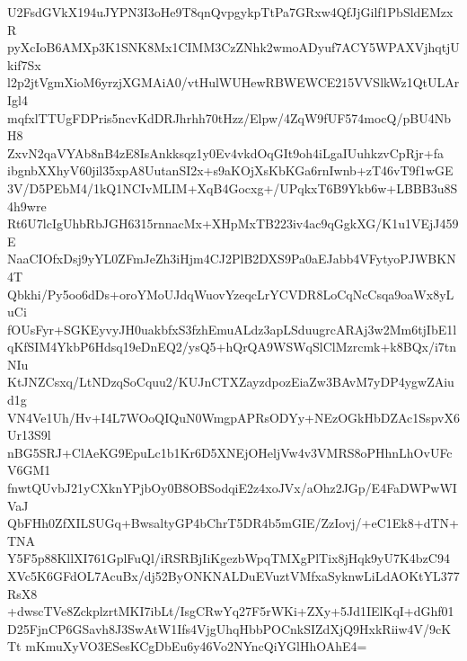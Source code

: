U2FsdGVkX194uJYPN3I3oHe9T8qnQvpgykpTtPa7GRxw4QfJjGilf1PbSldEMzxR
pyXcIoB6AMXp3K1SNK8Mx1CIMM3CzZNhk2wmoADyuf7ACY5WPAXVjhqtjUkif7Sx
l2p2jtVgmXioM6yrzjXGMAiA0/vtHulWUHewRBWEWCE215VVSlkWz1QtULArIgl4
mqfxlTTUgFDPris5ncvKdDRJhrhh70tHzz/Elpw/4ZqW9fUF574mocQ/pBU4NbH8
ZxvN2qaVYAb8nB4zE8IsAnkksqz1y0Ev4vkdOqGIt9oh4iLgaIUuhkzvCpRjr+fa
ibgnbXXhyV60jil35xpA8UutanSI2x+s9aKOjXsKbKGa6rnIwnb+zT46vT9f1wGE
3V/D5PEbM4/1kQ1NCIvMLIM+XqB4Gocxg+/UPqkxT6B9Ykb6w+LBBB3u8S4h9wre
Rt6U7lcIgUhbRbJGH6315rnnacMx+XHpMxTB223iv4ac9qGgkXG/K1u1VEjJ459E
NaaCIOfxDsj9yYL0ZFmJeZh3iHjm4CJ2PlB2DXS9Pa0aEJabb4VFytyoPJWBKN4T
Qbkhi/Py5oo6dDs+oroYMoUJdqWuovYzeqcLrYCVDR8LoCqNcCsqa9oaWx8yLuCi
fOUsFyr+SGKEyvyJH0uakbfxS3fzhEmuALdz3apLSduugrcARAj3w2Mm6tjIbE1l
qKfSIM4YkbP6Hdsq19eDnEQ2/ysQ5+hQrQA9WSWqSlClMzrcmk+k8BQx/i7tnNIu
KtJNZCsxq/LtNDzqSoCquu2/KUJnCTXZayzdpozEiaZw3BAvM7yDP4ygwZAiud1g
VN4Ve1Uh/Hv+I4L7WOoQIQuN0WmgpAPRsODYy+NEzOGkHbDZAc1SspvX6Ur13S9l
nBG5SRJ+ClAeKG9EpuLc1b1Kr6D5XNEjOHeljVw4v3VMRS8oPHhnLhOvUFcV6GM1
fnwtQUvbJ21yCXknYPjbOy0B8OBSodqiE2z4xoJVx/aOhz2JGp/E4FaDWPwWIVaJ
QbFHh0ZfXILSUGq+BwsaltyGP4bChrT5DR4b5mGIE/ZzIovj/+eC1Ek8+dTN+TNA
Y5F5p88KllXI761GplFuQl/iRSRBjIiKgezbWpqTMXgPlTix8jHqk9yU7K4bzC94
XVc5K6GFdOL7AcuBx/dj52ByONKNALDuEVuztVMfxaSyknwLiLdAOKtYL377RsX8
+dwscTVe8ZckplzrtMKI7ibLt/IsgCRwYq27F5rWKi+ZXy+5Jd1IElKqI+dGhf01
D25FjnCP6GSavh8J3SwAtW1Ifs4VjgUhqHbbPOCnkSIZdXjQ9HxkRiiw4V/9cKTt
mKmuXyVO3ESesKCgDbEu6y46Vo2NYncQiYGlHhOAhE4=
